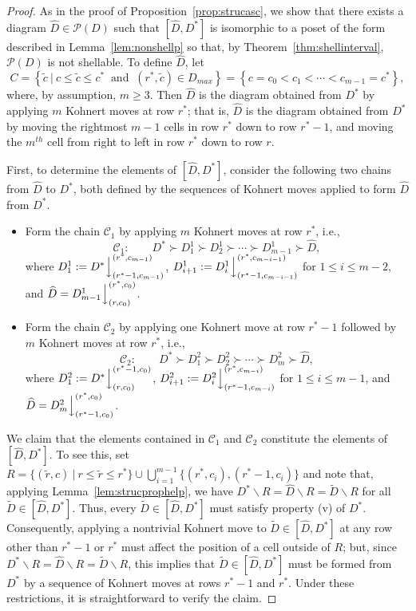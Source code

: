 \documentclass[letterpaper,10pt]{article}
\newcommand{\ldownarrow}{\Big\downarrow}
\begin{document}
\begin{proof}
As in the proof of Proposition~\ref{prop:strucasc}, we show that there exists a diagram $\widehat{D}\in \mathcal{P}(D)$ such that $[\widehat{D}, D^*]$ is isomorphic to a poset of the form described in Lemma~\ref{lem:nonshellp} so that, by Theorem~\ref{thm:shellinterval}, $\mathcal{P}(D)$ is not shellable. To define $\widehat{D}$, let
$$C= \left\{\tilde{c}~|~ c\leq \tilde{c} \leq c^*\ \text{ and } \ (r^*,\tilde{c})\in D_{max} \right\} = \left\{ c=c_0 < c_1 < \cdots < c_{m-1} = c^*\right\},$$ where, by assumption, $m\ge 3$.
Then $\widehat{D}$ is the diagram obtained from $D^*$ by applying $m$ Kohnert moves at row $r^*$; that is, $\widehat{D}$ is the diagram obtained from $D^*$ by moving the rightmost $m-1$ cells in row $r^*$ down to row $r^*-1$, and moving the $m^{th}$ cell from right to left in row $r^*$ down to row $r$. 

First, to determine the elements of $[\widehat{D},D^*]$, consider the following two chains from $\widehat{D}$ to $D^*$, both defined by the sequences of Kohnert moves applied to form $\widehat{D}$ from $D^*$.
\begin{itemize}
    \item[1)] Form the chain $\mathcal{C}_1$ by applying $m$ Kohnert moves at row $r^*$, i.e.,
    $$ 
    \mathcal{C}_1: \qquad D^* \succ D^1_1  \succ 
    D^1_2 \succ \cdots \succ D^1_{m-1} \succ \widehat{D},
    $$
    where 
    $D^1_1 := D^* \ldownarrow^{(r^*,c_{m-1})}_{(r^*-1,c_{m-1})}$, $D^1_{i+1}:= D^1_{i} \ldownarrow^{(r^*,c_{m-i-1})}_{(r^*-1,c_{m-i-1})}$ for $1\leq i \leq m-2$, and $\widehat{D} = D^1_{m-1} \ldownarrow^{(r^*,c_0)}_{(r,c_0)}$.

    \item[2)] Form the chain $\mathcal{C}_2$ by applying one Kohnert move at row $r^*-1$ followed by $m$ Kohnert moves at row $r^*$, i.e.,
      $$ 
    \mathcal{C}_2:\qquad D^* \succ D_1^2  \succ 
    D_2^2 \succ \cdots \succ D_{m}^2 \succ \widehat{D},
    $$
    where
 $D_1^2 := D^* \ldownarrow^{(r^*-1,c_0)}_{(r,c_0)}$, $D_{i+1}^2:= D_{i}^2 \ldownarrow^{(r^*,c_{m-i})}_{(r^*-1,c_{m-i})}$ for $1\leq i \leq m-1$, and $\widehat{D} = D_{m}^2\ldownarrow^{(r^*,c_0)}_{(r^*-1,c_0)}$.
\end{itemize}
We claim that the elements contained in $\mathcal{C}_1$ and $\mathcal{C}_2$ constitute the elements of $[\widehat{D},D^*]$. To see this, set $R=\{(\tilde{r},c)~|~r\le \tilde{r}\le r^*\}\cup\bigcup_{i=1}^{m-1}\{(r^*,c_i),(r^*-1,c_i)\}$ and note that, applying Lemma~\ref{lem:strucprophelp}, we have $D^*\backslash R=\widehat{D}\backslash R=\tilde{D}\backslash R$ for all $\tilde{D}\in [\widehat{D},D^*]$. Thus, every $\tilde{D}\in [\widehat{D},D^*]$ must satisfy property (v) of $D^*$. Consequently, applying a nontrivial Kohnert move to $\tilde{D}\in [\widehat{D},D^*]$ at any row other than $r^*-1$ or $r^*$ must affect the position of a cell outside of $R$; but, since $D^*\backslash R=\widehat{D}\backslash R=\tilde{D}\backslash R$, this implies that $\tilde{D}\in [\widehat{D},D^*]$ must be formed from $D^*$ by a sequence of Kohnert moves at rows $r^*-1$ and $r^*$. Under these restrictions, it is straightforward to verify the claim.


\end{proof}
\end{document}
